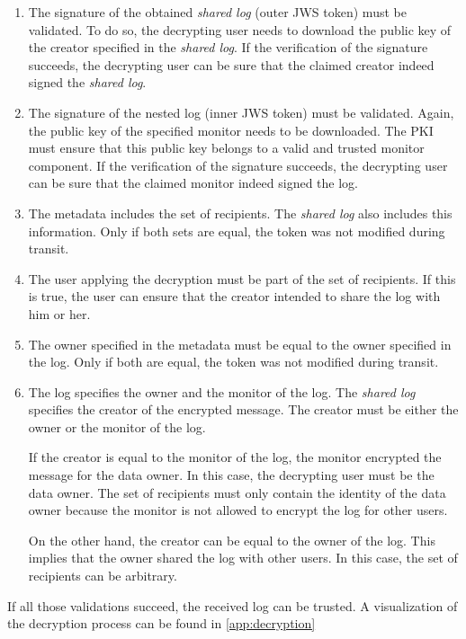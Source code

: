 \documentclass[../main.tex]{subfiles}
\begin{document}
\begin{enumerate}
    \item 
    The signature of the obtained \emph{shared log} (outer JWS token) must be validated.
    To do so, the decrypting user needs to download the public key of the creator specified in the \emph{shared log}.
    If the verification of the signature succeeds, the decrypting user can be sure that the claimed creator indeed signed the \emph{shared log}.
    \item
    The signature of the nested log (inner JWS token) must be validated.
    Again, the public key of the specified monitor needs to be downloaded.
    The PKI must ensure that this public key belongs to a valid and trusted monitor component.
    If the verification of the signature succeeds, the decrypting user can be sure that the claimed monitor indeed signed the log.
    \item
    The metadata includes the set of recipients.
    The \emph{shared log} also includes this information.
    Only if both sets are equal, the token was not modified during transit.
    \item
    The user applying the decryption must be part of the set of recipients.
    If this is true, the user can ensure that the creator intended to share the log with him or her.
    \item
    The owner specified in the metadata must be equal to the owner specified in the log.
    Only if both are equal, the token was not modified during transit.
    \item
    The log specifies the owner and the monitor of the log.
    The \emph{shared log} specifies the creator of the encrypted message.
    The creator must be either the owner or the monitor of the log.
    
    If the creator is equal to the monitor of the log, the monitor encrypted the message for the data owner.
    In this case, the decrypting user must be the data owner.
    The set of recipients must only contain the identity of the data owner because the monitor is not allowed to encrypt the log for other users.

    On the other hand, the creator can be equal to the owner of the log.
    This implies that the owner shared the log with other users.
    In this case, the set of recipients can be arbitrary.
\end{enumerate}
If all those validations succeed, the received log can be trusted.
A visualization of the decryption process can be found in \cref{app:decryption}
\end{document}
